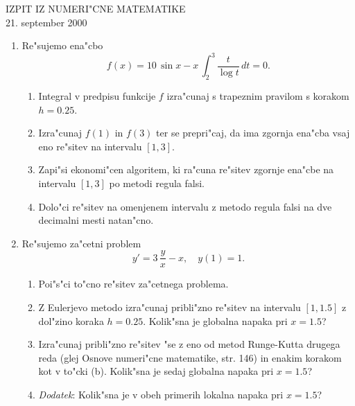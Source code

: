 
\begin{center}
  IZPIT IZ NUMERI"CNE MATEMATIKE\\
  21. september 2000
\end{center}

\begin{enumerate}

  \item Re"sujemo ena"cbo
    $$f(x)=10\,\sin{x}-x\,\int_{2}^{3}\frac{t}{\log{t}}\,dt=0.$$
  \begin{enumerate}
   
     \item Integral v predpisu funkcije $f$ izra"cunaj s trapeznim
       pravilom s korakom $h=0.25$.

     \item Izra"cunaj $f(1)$ in $f(3)$ ter se prepri"caj, da 
       ima zgornja ena"cba vsaj eno re"sitev na intervalu
       $[1,3]$.

     \item Zapi"si ekonomi"cen algoritem, ki ra"cuna re"sitev
       zgornje ena"cbe na intervalu $[1,3]$ po metodi regula 
       falsi.

     \item Dolo"ci re"sitev na omenjenem intervalu z metodo 
       regula falsi na dve decimalni mesti natan"cno.
  \end{enumerate}

  \item Re"sujemo za"cetni problem
    $$y'=3\,\frac{y}{x}-x,\quad y(1)=1.$$

  \begin{enumerate}
    
    \item Poi"s"ci to"cno re"sitev za"cetnega problema.

    \item Z Eulerjevo metodo izra"cunaj pribli"zno re"sitev
      na intervalu $[1,1.5]$ z dol"zino koraka $h=0.25$. Kolik"sna
      je globalna napaka pri $x=1.5$?

    \item Izra"cunaj pribli"zno re"sitev "se z eno od metod 
      Runge-Kutta drugega reda (glej Osnove numeri"cne matematike, str. 146)
      in enakim korakom kot v to"cki (b). Kolik"sna je sedaj globalna 
      napaka pri $x=1.5$?

    \item {\it Dodatek}: Kolik"sna je v obeh primerih lokalna 
      napaka pri $x=1.5$?

  \end{enumerate} 
\end{enumerate}


